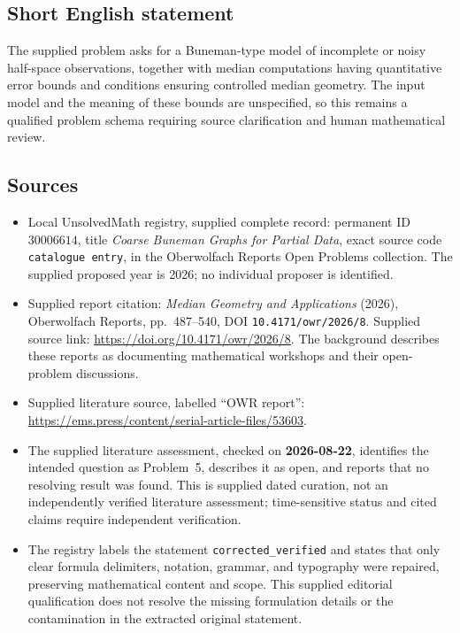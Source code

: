 \documentclass[11pt]{article}
\begin{document}
\subsection{Short English statement}
The supplied problem asks for a Buneman-type model of incomplete or noisy half-space observations, together with median computations having quantitative error bounds and conditions ensuring controlled median geometry. The input model and the meaning of these bounds are unspecified, so this remains a qualified problem schema requiring source clarification and human mathematical review.
\subsection{Sources}
\begin{itemize}
\item Local UnsolvedMath registry, supplied complete record: permanent ID \(30006614\), title \emph{Coarse Buneman Graphs for Partial Data}, exact source code \texttt{catalogue entry}, in the Oberwolfach Reports Open Problems collection. The supplied proposed year is 2026; no individual proposer is identified.
\item Supplied report citation: \emph{Median Geometry and Applications} (2026), Oberwolfach Reports, pp.~487--540, DOI \texttt{10.4171/owr/2026/8}. Supplied source link: \url{https://doi.org/10.4171/owr/2026/8}. The background describes these reports as documenting mathematical workshops and their open-problem discussions.
\item Supplied literature source, labelled ``OWR report'': \url{https://ems.press/content/serial-article-files/53603}.
\item The supplied literature assessment, checked on \textbf{2026-08-22}, identifies the intended question as Problem~5, describes it as open, and reports that no resolving result was found. This is supplied dated curation, not an independently verified literature assessment; time-sensitive status and cited claims require independent verification.
\item The registry labels the statement \texttt{corrected\_verified} and states that only clear formula delimiters, notation, grammar, and typography were repaired, preserving mathematical content and scope. This supplied editorial qualification does not resolve the missing formulation details or the contamination in the extracted original statement.
\end{itemize}
\end{document}
